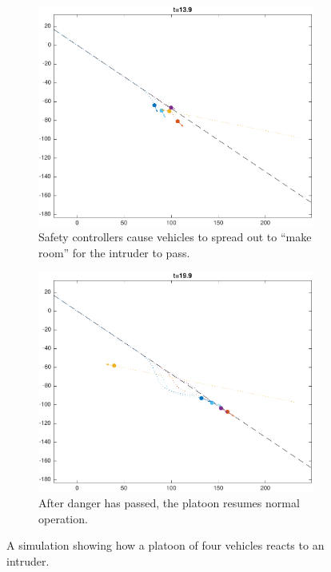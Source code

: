 \begin{figure}
    \begin{subfigure}[t]{0.45\columnwidth} \label{subfig:in_140}
        \includegraphics[width=\columnwidth]{fig/in_140}
        \caption{Safety controllers cause vehicles to spread out to ``make room'' for the intruder to pass.}
    \end{subfigure}
    \begin{subfigure}[t]{0.45\columnwidth} \label{subfig:in_200}
        \includegraphics[width=\columnwidth]{fig/in_200}
        \caption{After danger has passed, the platoon resumes normal operation.}
    \end{subfigure}   
    \caption{A simulation showing how a platoon of four vehicles reacts to an intruder. \label{fig:in}}
\end{figure}

